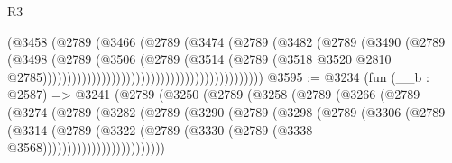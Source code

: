 \begin{lexlean}{R3}
\begin{coremodule}
                                                            (@3458
                                                              (@2789
                                                                (@3466
                                                                  (@2789
                                                                    (@3474
                                                                      (@2789
                                                                        (@3482
                                                                          (@2789
                                                                            (@3490
                                                                              (@2789
                                                                                (@3498
                                                                                  (@2789
                                                                                    (@3506
                                                                                      (@2789
                                                                                        (@3514
                                                                                          (@2789
                                                                                            (@3518
                                                                                              @3520
                                                                                              @2810
                                                                                              @2785)))))))))))))))))))))))))))))))))))))))))))))
@3595 := @3234
    (fun (__b : @2587) =>
    @3241
      (@2789
        (@3250
          (@2789
            (@3258
              (@2789
                (@3266
                  (@2789
                    (@3274
                      (@2789
                        (@3282
                          (@2789
                            (@3290
                              (@2789
                                (@3298
                                  (@2789
                                    (@3306
                                      (@2789
                                        (@3314
                                          (@2789
                                            (@3322
                                              (@2789
                                                (@3330 (@2789 (@3338 @3568)))))))))))))))))))))))))

\end{coremodule}
\end{lexlean}
